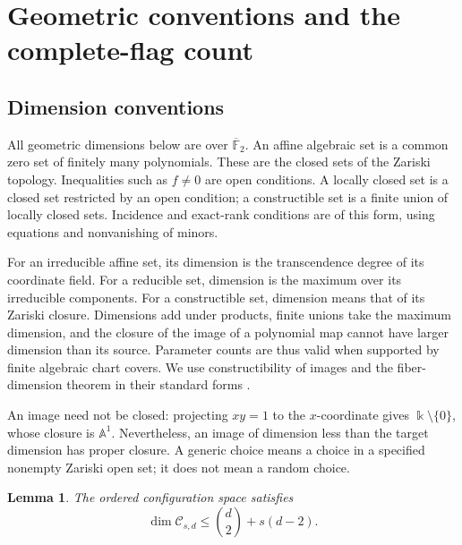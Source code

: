 \documentclass[11pt,a4paper]{article}
\newcommand{\F}{\mathbb F}
\newcommand{\A}{\mathbb A}
\newcommand{\Ccal}{\mathcal C}
\newtheorem{lemma}[theorem]{Lemma}
\theoremstyle{definition}
\theoremstyle{remark}
\numberwithin{equation}{section}
\begin{document}
\section{Geometric conventions and the complete-flag count}

\subsection{Dimension conventions}
All geometric dimensions below are over $\overline{\F}_2$. An affine algebraic set is a common zero set of finitely many polynomials. These are the closed sets of the Zariski topology. Inequalities such as $f\ne0$ are open conditions. A locally closed set is a closed set restricted by an open condition; a constructible set is a finite union of locally closed sets. Incidence and exact-rank conditions are of this form, using equations and nonvanishing of minors.

For an irreducible affine set, its dimension is the transcendence degree of its coordinate field. For a reducible set, dimension is the maximum over its irreducible components. For a constructible set, dimension means that of its Zariski closure. Dimensions add under products, finite unions take the maximum dimension, and the closure of the image of a polynomial map cannot have larger dimension than its source. Parameter counts are thus valid when supported by finite algebraic chart covers. We use constructibility of images and the fiber-dimension theorem in their standard forms \cite[Chapter I]{Hartshorne}.

An image need not be closed: projecting $xy=1$ to the $x$-coordinate gives $\Bbbk\setminus\{0\}$, whose closure is $\A^1$. Nevertheless, an image of dimension less than the target dimension has proper closure. A generic choice means a choice in a specified nonempty Zariski open set; it does not mean a random choice.

\begin{lemma}\label{lem:complete-flag-bound}
The ordered configuration space satisfies
\[
\dim\Ccal_{s,d}\le\binom d2+s(d-2).
\]
\end{lemma}
\end{document}
